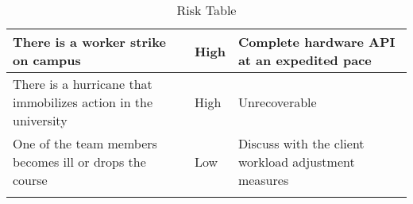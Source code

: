 \begin{longtable}{|m{}|m{}|m{}|}
	There is a worker strike on campus                             & High                & Complete hardware API at an expedited pace                                                                                                                               \\ \hline
	There is a hurricane that immobilizes action in the university & High                & Unrecoverable                                                                                                                                                            \\ \hline
	One of the team members becomes ill or drops the course        & Low                 & Discuss with the client workload adjustment measures                                                                                                                     \\ \hline
	\caption{Risk Table}
	\label{tab:RiskTable}
\end{longtable}
